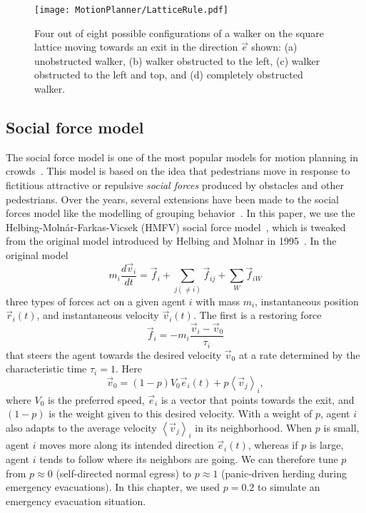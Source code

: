 \begin{figure*}[!tb]
\centering
\texttt{[image: MotionPlanner/LatticeRule.pdf]}
\caption[Working of lattice gas model]{Four out of eight possible configurations of a walker on the square lattice moving towards an exit in the direction $\vec{e}$ shown: (a) unobstructed walker, (b) walker obstructed to the left, (c) walker obstructed to the left and top, and (d) completely obstructed walker.}
\label{fig:latticeGasMovement}
\end{figure*}



\subsection{Social force model}
\label{SocialForceModel}

The social force model is one of the most popular models for motion planning in crowds~\cite{Kamphuis:2004uu,Xi:2010uc,Peng:2009cc}. This model is based on the idea that pedestrians move in response to fictitious attractive or repulsive \emph{social forces} produced by obstacles and other pedestrians.  Over the years, several extensions have been made to the social forces model like the modelling of grouping behavior~\cite{Kamphuis:2004uu}. In this paper, we use the Helbing-Moln\'ar-Farkas-Vicsek (HMFV) social force model~\cite{Helbing:1995ie}, which is tweaked from the original model introduced by Helbing and Molnar in 1995~\cite{Helbing:1995ie}. In the original model
\begin{equation} \label{eqn:SFeqn}
m_i \frac{d\vec{v}_i}{dt}=\vec{f}_{i}+\sum_{j(\neq i)}\vec{f}_{ij}+\sum_{W}\vec{f}_{iW}
\end{equation}
three types of forces act on a given agent $i$ with mass $m_i$, instantaneous position $\vec{r}_i(t)$, and instantaneous velocity $\vec{v}_i(t)$. The first is a restoring force
\begin{equation}
\vec{f}_i = -m_i \frac{\vec{v}_i-\vec{v}_0}{\tau_i}
\end{equation}
that steers the agent towards the desired velocity $\vec{v}_0$ at a rate determined by the characteristic time $\tau_i = 1$. Here
\begin{equation}
\vec{v}_0=(1-p)V_0\vec{e}_i(t)+p\left<\vec{v}_j\right>_i,
\end{equation}
where $V_0$ is the preferred speed, $\vec{e}_i$ is a vector that points towards the exit, and $(1 - p)$ is the weight given to this desired velocity. With a weight of $p$, agent $i$ also adapts to the average velocity $\left<\vec{v}_j\right>_i$ in its neighborhood. When $p$ is small, agent $i$ moves more along its intended direction $\vec{e}_i(t)$, whereas if $p$ is large, agent $i$ tends to follow where its neighbors are going. We can therefore tune $p$ from $p \approx 0$ (self-directed normal egress) to $p \approx 1$ (panic-driven herding during emergency evacuations). In this chapter, we used $p = 0.2$ to simulate an emergency evacuation situation.

